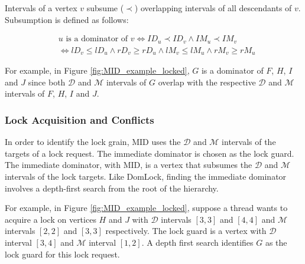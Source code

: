 Intervals of a vertex $v$ subsume ($\prec$) overlapping intervals of all descendants of $v$. Subsumption is defined as follows:

\begin{equation}
    \begin{split}
        & u \text{ is a dominator of } v \iff ID_u \prec ID_v \land IM_u \prec IM_v
        \\ & \iff lD_v \leq lD_u \land rD_v \geq rD_u \land lM_v \leq lM_u \land rM_v \geq rM_u
    \end{split}
\end{equation}

For example, in Figure \ref{fig:MID_example_locked}, $G$ is a dominator of $F$, $H$, $I$ and $J$ since both $\mathcal{D}$ and $\mathcal{M}$ intervals of $G$ overlap with the respective $\mathcal{D}$ and $\mathcal{M}$ intervals of $F$, $H$, $I$ and $J$.

\subsubsection{Lock Acquisition and Conflicts}
In order to identify the lock grain, MID uses the $\mathcal{D}$ and $\mathcal{M}$ intervals of the targets of a lock request. The immediate dominator is chosen as the lock guard. The immediate dominator, with MID, is a vertex that subsumes the $\mathcal{D}$ and $\mathcal{M}$ intervals of the lock targets. Like DomLock, finding the immediate dominator involves a depth-first search from the root of the hierarchy.

For example, in Figure \ref{fig:MID_example_locked}, suppose a thread wants to acquire a lock on vertices $H$ and $J$ with $\mathcal{D}$ intervals $[3,3]$ and $[4,4]$ and $\mathcal{M}$ intervals $[2,2]$ and $[3,3]$ respectively. The lock guard is a vertex with $\mathcal{D}$ interval $[3,4]$ and $\mathcal{M}$ interval $[1,2]$. A depth first search identifies $G$ as the lock guard for this lock request. 


